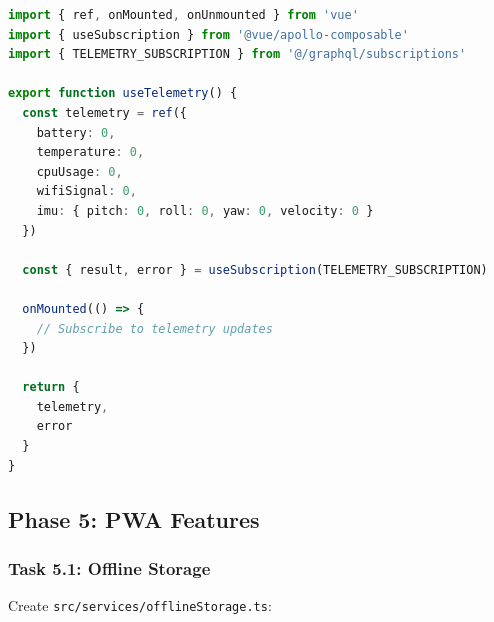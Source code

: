 \begin{lstlisting}[language=TypeScript, caption=useTelemetry.ts]
import { ref, onMounted, onUnmounted } from 'vue'
import { useSubscription } from '@vue/apollo-composable'
import { TELEMETRY_SUBSCRIPTION } from '@/graphql/subscriptions'

export function useTelemetry() {
  const telemetry = ref({
    battery: 0,
    temperature: 0,
    cpuUsage: 0,
    wifiSignal: 0,
    imu: { pitch: 0, roll: 0, yaw: 0, velocity: 0 }
  })

  const { result, error } = useSubscription(TELEMETRY_SUBSCRIPTION)

  onMounted(() => {
    // Subscribe to telemetry updates
  })

  return {
    telemetry,
    error
  }
}
\end{lstlisting}

\subsection{Phase 5: PWA Features}

\subsubsection{Task 5.1: Offline Storage}

Create \texttt{src/services/offlineStorage.ts}:

